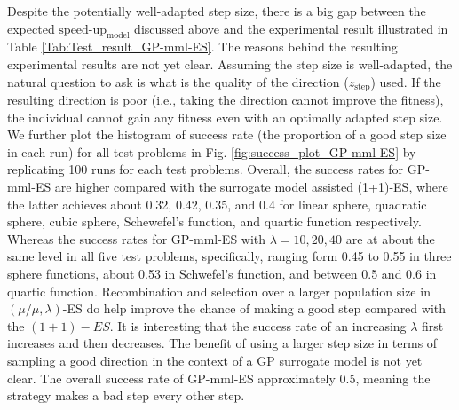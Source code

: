 Despite the potentially well-adapted step size, there is a big gap between the expected $\text{speed-up}_{\text{model}}$ discussed above and the experimental result illustrated in Table \ref{Tab:Test_result_GP-mml-ES}. The reasons behind the resulting experimental results are not yet clear. Assuming the step size is well-adapted, the natural question to ask is what is the quality of the direction ($z_{\text{step}}$) used. If the resulting direction is poor (i.e., taking the direction cannot improve the fitness), the individual cannot gain any fitness even with an optimally adapted step size. We further plot the histogram of success rate (the proportion of a good step size in each run) for all test problems in Fig. \ref{fig:success_plot_GP-mml-ES} by replicating 100 runs for each test problems. Overall, the success rates for GP-mml-ES are higher compared with the surrogate model assisted (1+1)-ES, where the latter achieves about 0.32, 0.42, 0.35, and 0.4 for linear sphere, quadratic sphere, cubic sphere, Schewefel's function, and quartic function respectively. Whereas the success rates for GP-mml-ES with $\lambda=10,20,40$ are at about the same level in all five test problems, specifically, ranging form 0.45 to 0.55 in three sphere functions, about 0.53 in Schwefel's function, and between 0.5 and 0.6 in quartic function. Recombination and selection over a larger population size in $(\mu/\mu,\lambda)$-ES do help improve the chance of making a good step compared with the $(1+1)-ES$. It is interesting that the success rate of an increasing $\lambda$ first increases and then decreases. The benefit of using a larger step size in terms of sampling a good direction in the context of a GP surrogate model is not yet clear. The overall success rate {}of GP-mml-ES approximately 0.5, meaning the strategy makes a bad step every other step. 





